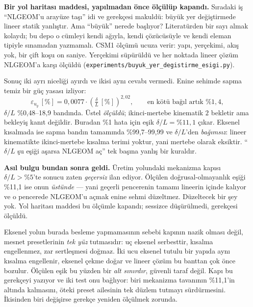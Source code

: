 \documentclass[11pt,a4paper]{article}
\begin{document}
\begin{description}
        \medskip
        \noindent \textbf{Bir yol haritası maddesi, yapılmadan önce
        ölçülüp kapandı.} Sıradaki iş ``NLGEOM'u arayüze taşı'' idi ve
        gerekçesi makuldü: büyük yer değiştirmede lineer statik yanlıştır.
        Ama ``büyük'' nerede başlıyor? Literatürden bir sayı almak kolaydı;
        bu depo o cümleyi kendi ağıyla, kendi çözücüsüyle ve kendi eleman
        tipiyle sınamadan yazmamalı. CSM1 ölçümü ucuza verir: yapı,
        yerçekimi, akış yok, bir çift koşu on saniye. Yerçekimi süpürüldü
        ve her noktada lineer çözüm NLGEOM'a karşı ölçüldü
        (\texttt{experiments/buyuk\_yer\_degistirme\_esigi.py}).

        \noindent Sonuç iki ayrı niceliği ayırdı ve ikisi aynı cevabı
        vermedi. Enine sehimde sapma temiz bir güç yasası izliyor:
        \[
            \varepsilon_{u_y}\,[\%] = 0{,}0077 \cdot
            \left(\tfrac{\delta}{L}\,[\%]\right)^{2{,}02},
            \qquad \text{en kötü bağıl artık } \%1{,}4,
        \]
        $\delta/L$ \%0{,}48--18{,}9 bandında. Üstel \emph{ölçüldü};
        ikinci-mertebe kinematik $2$ bekletir ama bekleyiş kanıt değildir.
        Buradan \%1 hata için eşik $\delta/L = \%11{,}1$ çıkar. Eksenel
        kısalmada ise sapma bandın tamamında \%99{,}7--99{,}99 ve
        $\delta/L$'den \emph{bağımsız}: lineer kinematikte ikinci-mertebe
        kısalma terimi yoktur, yani mertebe olarak eksiktir. ``$\delta/L$
        şu eşiği aşarsa NLGEOM aç'' tek başına yanlış bir kuraldır.

        \noindent \textbf{Asıl bulgu bundan sonra geldi.} Üretim yolundaki
        mekanizma kapısı $\delta/L > \%5$'te sonucu zaten \emph{geçersiz}
        ilan ediyor. Ölçülen doğrusal-olmayanlık eşiği \%11{,}1 ise onun
        \emph{üstünde} --- yani geçerli pencerenin tamamı lineerin içinde
        kalıyor ve o pencerede NLGEOM'u açmak enine sehmi düzeltmez.
        Düzeltecek bir şey yok. Yol haritası maddesi bu ölçümle kapandı;
        sessizce düşürülmedi, gerekçesi ölçüldü.

        \noindent Eksenel yolun burada besleme yapmamasının sebebi kapının
        nazik olması değil, mesnet presetlerinin \emph{tek yüz} tutmasıdır:
        uç eksenel serbesttir, kısalma engellenmez, zar sertleşmesi doğmaz.
        İki ucu eksenel tutulu bir yapıda aynı kısalma engellenir, eksenel
        çekme doğar ve lineer çözüm bu banttan çok önce bozulur. Ölçülen
        eşik bu yüzden bir \emph{alt sınırdır}, güvenli taraf değil. Kapı
        bu gerekçeyi yazıyor ve iki test onu bağlıyor: biri mekanizma
        tavanının \%11{,}1'in altında kalmasını, öteki preset ailesinin tek
        düzlem tutmayı sürdürmesini. İkisinden biri değişirse gerekçe
        yeniden ölçülmek zorunda.


\end{description}
\end{document}
